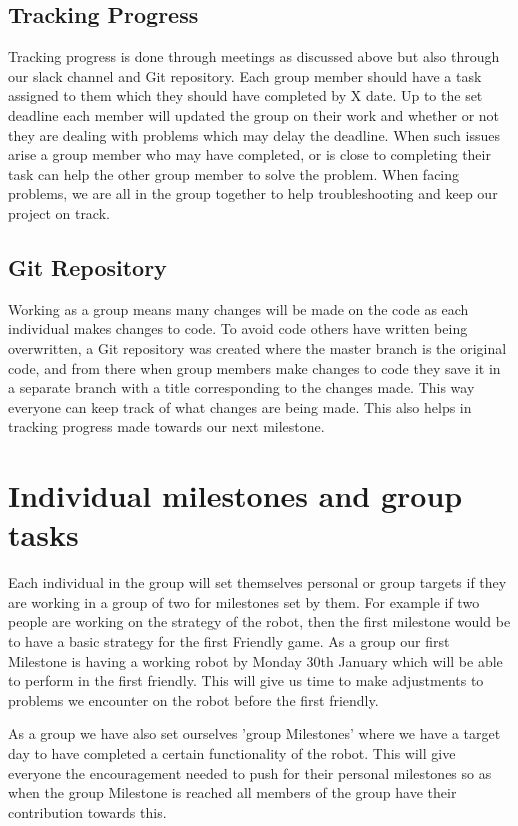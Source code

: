 \documentclass{article}
\begin{document}
\subsection{Tracking Progress}
Tracking progress is done through meetings as discussed above but also through our slack channel and Git repository. Each group member should have a task assigned to them which they should have completed by X date. Up to the set deadline each member will updated the group on their work and whether or not they are dealing with problems which may delay the deadline. When such issues arise a group member who may have completed, or is close to completing their task can help the other group member to solve the problem. When facing problems, we are all in the group together to help troubleshooting and keep our project on track.

\subsection{Git Repository}
Working as a group means many changes will be made on the code as each individual makes changes to code. To avoid code others have written being overwritten, a Git repository was created where the master branch is the original code, and from there when group members make changes to code they save it in a separate branch with a title corresponding to the changes made. This way everyone can keep track of what changes are being made. This also helps in tracking progress made towards our next milestone.


\section{Individual milestones and group tasks}
Each individual in the group will set themselves personal or group targets if they are working in a group of two for milestones set by them. For example if two people are working on the strategy of the robot, then the first milestone would be to have a basic strategy for the first Friendly game. As a group our first Milestone is having a working robot by Monday 30th January which will be able to perform in the first friendly. This will give us time to make adjustments to problems we encounter on the robot before the first friendly. 

As a group we have also set ourselves 'group Milestones' where we have a target day to have completed a certain functionality of the robot. This will give everyone the encouragement needed to push for their personal milestones so as when the group Milestone is reached all members of the group have their contribution towards this. 
\end{document}
